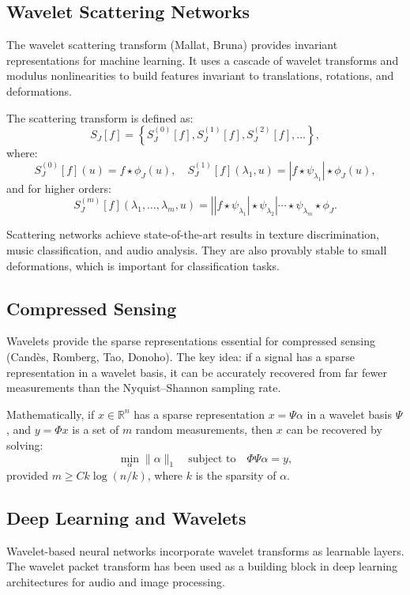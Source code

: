 \subsection{Wavelet Scattering Networks}

The wavelet scattering transform (Mallat, Bruna) provides invariant representations for machine learning. It uses a cascade of wavelet transforms and modulus nonlinearities to build features invariant to translations, rotations, and deformations.

The scattering transform is defined as:
\[
S_J[f] = \left\{ S_J^{(0)}[f], S_J^{(1)}[f], S_J^{(2)}[f], \ldots \right\},
\]
where:
\[
S_J^{(0)}[f](u) = f \star \phi_J(u), \quad
S_J^{(1)}[f](\lambda_1, u) = |f \star \psi_{\lambda_1}| \star \phi_J(u),
\]
and for higher orders:
\[
S_J^{(m)}[f](\lambda_1, \ldots, \lambda_m, u) = \left| \left| f \star \psi_{\lambda_1} \right| \star \psi_{\lambda_2} \right| \cdots \star \psi_{\lambda_m} \star \phi_J.
\]

Scattering networks achieve state-of-the-art results in texture discrimination, music classification, and audio analysis. They are also provably stable to small deformations, which is important for classification tasks.

\subsection{Compressed Sensing}

Wavelets provide the sparse representations essential for compressed sensing (Cand\`es, Romberg, Tao, Donoho). The key idea: if a signal has a sparse representation in a wavelet basis, it can be accurately recovered from far fewer measurements than the Nyquist--Shannon sampling rate.

Mathematically, if $x \in \mathbb{R}^n$ has a sparse representation $x = \Psi \alpha$ in a wavelet basis $\Psi$, and $y = \Phi x$ is a set of $m$ random measurements, then $x$ can be recovered by solving:
\[
\min_{\alpha} \|\alpha\|_1 \quad \text{subject to} \quad \Phi \Psi \alpha = y,
\]
provided $m \geq C k \log(n/k)$, where $k$ is the sparsity of $\alpha$.

\subsection{Deep Learning and Wavelets}

Wavelet-based neural networks incorporate wavelet transforms as learnable layers. The wavelet packet transform has been used as a building block in deep learning architectures for audio and image processing.

